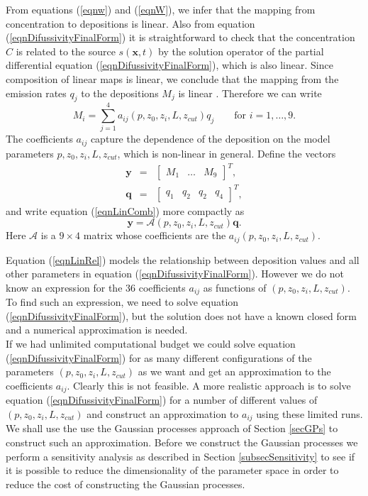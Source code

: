 \documentclass{sfuthesis}
\newcommand{\x}{\textbf{x}}
\newcommand{\y}{\textbf{y}}
\begin{document}
From equations (\ref{eqnw}) and (\ref{eqnW}),
we infer that the mapping from concentration to depositions is linear. Also from equation
(\ref{eqnDifussivityFinalForm}) it is straightforward to check that the concentration $C$
is related to the source $s(\x,t)$ by the solution operator of the  partial differential equation (\ref{eqnDifussivityFinalForm}),
which is also linear. Since composition
of linear maps is linear, we conclude that the mapping from the emission rates $q_{j}$ to the depositions $M_{j}$ is linear .
Therefore we can write
\begin{equation}\label{eqnLinComb}
M_{i}=\sum_{j=1}^{4}a_{ij}(p,z_{0},z_{i},L,z_{cut})q_{j}\qquad\text{for }i=1,\ldots, 9.
\end{equation}
The coefficients $a_{ij}$ capture the dependence of the deposition on the model 
parameters $p,z_{0},z_{i},L,z_{cut}$, which is non-linear in general. 
Define the vectors
\begin{eqnarray*}
\y& = &\begin{bmatrix}
M_{1}&\ldots & M_{9}
\end{bmatrix}^{T}, \\
\textbf{q}&=&\begin{bmatrix}
q_{1}&q_{2}&q_{2}&q_{4}
\end{bmatrix}^{T},
\end{eqnarray*}
and write equation (\ref{eqnLinComb}) more compactly as
\begin{equation}\label{eqnLinRel}
\y=\mathscr{A}(p,z_{0},z_{i},L,z_{cut})\textbf{q}.
\end{equation}
Here $\mathscr{A}$ is a $9\times 4$ matrix whose coefficients are the $a_{ij}(p,z_{0},z_{i},L,z_{cut})$.
\newline

Equation (\ref{eqnLinRel}) models the relationship between deposition values and all other
parameters  in equation (\ref{eqnDifussivityFinalForm}). However we do not 
know an expression for the 36 coefficients $a_{ij}$ as functions of
$(p,z_{0},z_{i},L,z_{cut})$. To find such  an expression, we need 
to solve equation (\ref{eqnDifussivityFinalForm}), but the solution does not have a known closed
form and  a numerical approximation is needed.
\\
If we had unlimited computational  budget we could solve equation 
(\ref{eqnDifussivityFinalForm}) for as many different configurations
of the parameters $(p,z_{0},z_{i},L,z_{cut})$ as we want and get an
approximation to the coefficients $a_{ij}$. Clearly this 
is not feasible. A more realistic approach is to solve equation (\ref{eqnDifussivityFinalForm})
for a number of different values of $(p,z_{0},z_{i},L,z_{cut})$ and construct an approximation to $a_{ij}$
using these limited runs. We shall use the use the Gaussian processes approach of Section \ref{secGPs}
to construct such an approximation. Before we construct the
Gaussian processes we perform a sensitivity analysis as described in Section \ref{subsecSensitivity} to see if it is possible
to reduce the dimensionality of the parameter space in order to  reduce the cost of constructing the Gaussian processes. 
\end{document}
